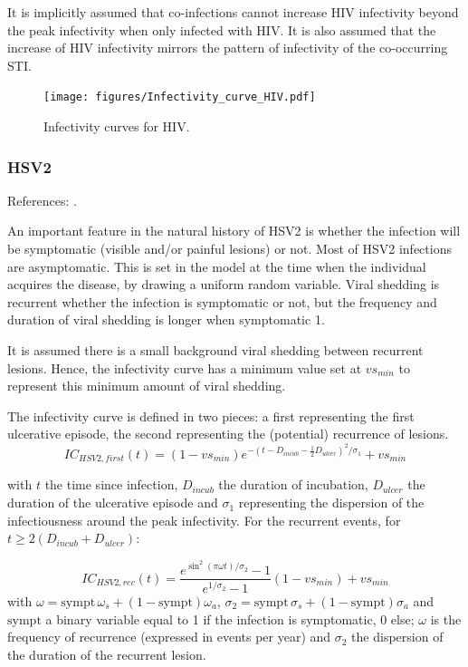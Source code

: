 \documentclass[11pt, onecolumn]{article}
\begin{document}
It is implicitly assumed that co-infections cannot increase HIV infectivity beyond the peak infectivity when only infected with HIV. It is also assumed that the increase of HIV infectivity mirrors the pattern of infectivity of the co-occurring STI.

\begin{figure}[!ht]
\centering
    \texttt{[image: figures/Infectivity\_curve\_HIV.pdf]}
\caption{Infectivity curves for HIV.}
\label{fig:InfectivityCurves}
\end{figure}


\subsubsection{HSV2}

References: \cite{Tronstein:2011vs,Schiffer:2014cc}.

An important feature in the natural history of HSV2 is whether the infection will be symptomatic (visible and/or painful lesions) or not.
Most of HSV2 infections are asymptomatic. This is set in the model at the time when the individual acquires the disease, by drawing a uniform random variable. Viral shedding is recurrent whether the infection is symptomatic or not, but the frequency and duration of viral shedding is longer when symptomatic 1. 

It is assumed there is a small background viral shedding between recurrent lesions. Hence, the infectivity curve has a minimum value set at $vs_{min}$ to represent this minimum amount of viral shedding. 

The infectivity curve is defined in two pieces: a first representing the first ulcerative episode, the second representing the (potential) recurrence of lesions.
$$IC_{HSV2,first}(t) = (1-vs_{min})e^{-(t-D_{incub}-\frac{1}{2}D_{ulcer})^2 / \sigma_1}+vs_{min}$$

with $t$ the time since infection, $D_{incub}$ the duration of incubation, $D_{ulcer}$ the duration of the ulcerative episode and $\sigma_1$ representing the dispersion of the infectiousness around the peak infectivity.
For the recurrent events, for $t \geq 2(D_{incub}+D_{ulcer})$:

$$ IC_{HSV2,rec}(t) =  \frac{e^{\sin^2(\pi\omega t)/\sigma_2}-1}{e^{1/\sigma_2}-1}  (1-vs_{min})+ vs_{min}$$
with $\omega = \mathrm{sympt}\,\omega_s + (1- \mathrm{sympt})\omega_a$, $\sigma_2 = \mathrm{sympt}\,\sigma_s + (1- \mathrm{sympt})\sigma_a$ and  $ \mathrm{sympt}$ a binary variable equal to 1 if the infection is symptomatic, 0 else; $\omega$ is the frequency of recurrence (expressed in events per year) and $\sigma_2$ the dispersion of the duration of the recurrent lesion.
\end{document}
